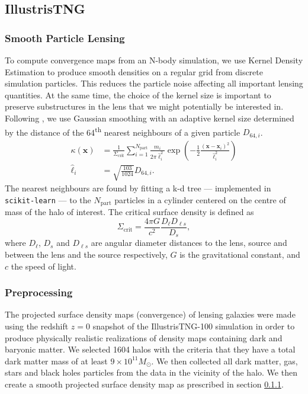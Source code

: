 \subsection{IllustrisTNG}\label{sec:kappa}
\subsubsection{Smooth Particle Lensing}\label{sec:SPL}
To compute convergence maps from an N-body simulation, 
we use Kernel Density Estimation to produce smooth densities on a regular grid from discrete simulation particles.
This reduces the particle noise affecting all 
important lensing quantities. At the same time, the choice of the kernel size 
is important to preserve substructures in the 
lens that we might potentially be interested in. Following \citet{Aubert2007,Rau2013}, we use Gaussian smoothing with an adaptive kernel size determined by the distance of the 64\textsuperscript{th} nearest neighbours of 
a given particle $D_{64,i}$. 
\begin{equation}\label{eq:Ksmooth}
\begin{aligned}
    \kappa(\mathbf{x}) &= \frac{1}{\Sigma_{\mathrm{crit}}} \sum_{i=1}^{N_{\mathrm{part}}}
        \frac{m_i}{2 \pi \hat{\ell}^2_i} 
        \exp \left(-\frac{1}{2} \frac{(\mathbf{x} - \mathbf{x}_i)^2}{\hat{\ell}_i^2}  \right) \\
    \hat{\ell}_i &= \sqrt{\frac{103}{1024}}D_{64,i}.
\end{aligned}
\end{equation}
The nearest neighbours are found by fitting a k-d tree ---  implemented in 
\texttt{scikit-learn} \citep{scikit-learn} --- 
to the $N_{\mathrm{part}}$  particles 
in a cylinder centered on the centre of mass of the halo of interest.
The critical surface density is defined as
\begin{equation}\label{eq:Scrit}
\Sigma_{\mathrm{crit}} = \frac{4 \pi G}{c^ 2} \frac{D_\ell D_{\ell s}}{D_s},
\end{equation}
where $D_\ell$, $D_s$ and $D_{\ell s}$ are angular diameter distances to the lens, source and between the lens and the source respectively, 
$G$ is the gravitational constant, and $c$ the speed of light.

\subsubsection{Preprocessing}
The projected surface density maps (convergence) of lensing galaxies 
were made using the redshift $z=0$ snapshot  
of the IllustrisTNG-100 simulation \citep{Nelson2018} 
in order to produce physically realistic realizations of density maps containing dark and baryonic matter.
We selected 1604 halos with the criteria that they have a total
dark matter mass of at least $9\times10^{11} M_{\odot}$. We then collected all 
dark matter, gas, stars and black holes particles from the data in the vicinity of the halo. We then create a smooth projected surface density map as prescribed in section \ref{sec:SPL}.

